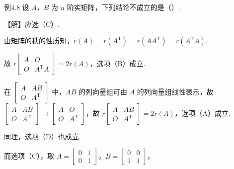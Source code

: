 \begin{fcard}{例4.8}
设 $A$，$B$ 为 $n$ 阶实矩阵，下列结论不成立的是（\quad）.


【解】应选（C）.

由矩阵的秩的性质知，$r(A)=r(A^{\mathrm{T}})=r(AA^{\mathrm{T}})=r(A^{\mathrm{T}}A)$.

故 $r\begin{bmatrix}A&O\\O&A^{\mathrm{T}}A\end{bmatrix}=2r(A)$，选项（B）成立.

在 $\begin{bmatrix}A&AB\\O&A^{\mathrm{T}}\end{bmatrix}$ 中，$AB$ 的列向量组可由 $A$ 的列向量组线性表示，故 $\begin{bmatrix}A&AB\\O&A^{\mathrm{T}}\end{bmatrix}\to\begin{bmatrix}A&O\\O&A^{\mathrm{T}}\end{bmatrix}$，故 $r\begin{bmatrix}A&AB\\O&A^{\mathrm{T}}\end{bmatrix}=2r(A)$，选项（A）成立.

同理，选项（D）也成立.

而选项（C），取 $A=\begin{bmatrix}0&1\\0&1\end{bmatrix}$，$B=\begin{bmatrix}0&0\\1&1\end{bmatrix}$，


\end{fcard}
